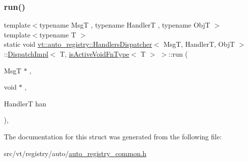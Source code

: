 \subsubsection{\texorpdfstring{run()}{run()}}
{\footnotesize\ttfamily template$<$typename MsgT , typename HandlerT , typename ObjT $>$ \\
template$<$typename T $>$ \\
static void \hyperlink{structvt_1_1auto__registry_1_1_handlers_dispatcher}{vt\+::auto\+\_\+registry\+::\+Handlers\+Dispatcher}$<$ MsgT, HandlerT, ObjT $>$\+::\hyperlink{structvt_1_1auto__registry_1_1_handlers_dispatcher_1_1_dispatch_impl}{Dispatch\+Impl}$<$ T, \hyperlink{structvt_1_1auto__registry_1_1_handlers_dispatcher_add4a5deacd38de5f66c799d6c2b6b62a}{is\+Active\+Void\+Fn\+Type}$<$ T $>$ $>$\+::run (\begin{DoxyParamCaption}\item[{MsgT $\ast$}]{,  }\item[{void $\ast$}]{,  }\item[{HandlerT}]{han }\end{DoxyParamCaption})\hspace{0.3cm}{\ttfamily [inline]}, {\ttfamily [static]}}



The documentation for this struct was generated from the following file\+:\begin{DoxyCompactItemize}
\item 
src/vt/registry/auto/\hyperlink{auto__registry__common_8h}{auto\+\_\+registry\+\_\+common.\+h}\end{DoxyCompactItemize}
